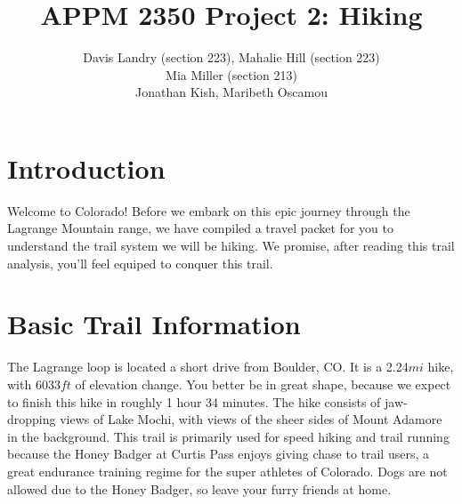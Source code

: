 \documentclass[12pt]{article}   %
\theoremstyle{definition}
\numberwithin{equation}{section}
\begin{document}
\parskip10pt
\parindent0pt
\baselineskip15pt
\doublespacing

\title{APPM 2350 Project 2: Hiking}
\author{Davis Landry (section 223), Mahalie Hill (section 223)\\Mia Miller (section 213) \\ Jonathan Kish, Maribeth Oscamou}

\pagestyle{fancy}
\renewcommand{\sectionmark}[1]{\markright{#1}{}}

\fancyhf{}

\rhead{\fancyplain{}{\thepage}} %
\lhead{\fancyplain{}{\rightmark }} %

\maketitle
\newpage
\tableofcontents
\newpage
\newpage
{}

\section{Introduction} \label{APPM2350proj01sec01}

\quad Welcome to Colorado! Before we embark on this epic journey through the Lagrange Mountain range, we have compiled a travel packet for you to understand the trail system we will be hiking. We promise, after reading this trail analysis, you'll feel equiped to conquer this trail.

\section{Basic Trail Information} \label{APPM2350proj01sec02}

\quad The Lagrange loop is located a short drive from Boulder, CO. It is a 2.24$mi$ hike, with 6033$ft$ of elevation change. You better be in great shape, because we expect to finish this hike in roughly 1 hour 34 minutes. The hike consists of jaw-dropping views of Lake Mochi, with views of the sheer sides of Mount Adamore in the background. This trail is primarily used for speed hiking and trail running because the Honey Badger at Curtis Pass enjoys giving chase to trail users, a great endurance training regime for the super athletes of Colorado. Dogs are not allowed due to the Honey Badger, so leave your furry friends at home.
\end{document}
